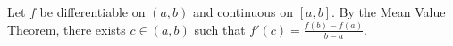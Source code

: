 Let $f$ be differentiable on $(a, b)$ and continuous on $[a, b]$.
By the Mean Value Theorem, there exists $c \in (a, b)$ such that $f'(c) = \frac{f(b) - f(a)}{b - a}$.